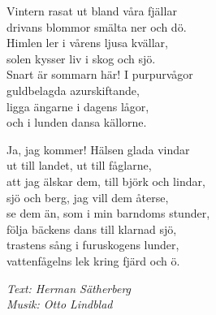 \vspace{10pt}
Vintern rasat ut bland våra fjällar\\
drivans blommor smälta ner och dö.\\
Himlen ler i vårens ljusa kvällar,\\
solen kysser liv i skog och sjö.\\
Snart är sommarn här! I purpurvågor \\
guldbelagda azurskiftande,\\
ligga ängarne i dagens lågor,\\
och i lunden dansa källorne.\par
\vspace{10pt}
Ja, jag kommer! Hälsen glada vindar\\
ut till landet, ut till fåglarne,\\
att jag älskar dem, till björk och lindar,\\
sjö och berg, jag vill dem återse,\\
se dem än, som i min barndoms stunder,\\
följa bäckens dans till klarnad sjö,\\
trastens sång i furuskogens lunder,\\
vattenfågelns lek kring fjärd och ö.\par
\vspace{10pt}
{\footnotesize\textit{Text: Herman Sätherberg\\ Musik: Otto Lindblad}}
